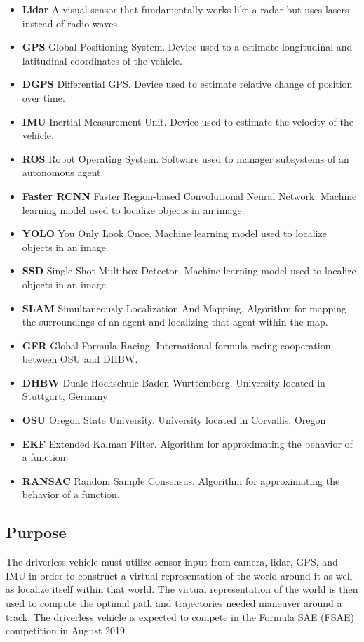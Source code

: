 \documentclass[10pt, onecolumn, draftclsnofoot, letterpaper,compsoc]{IEEEtran}
\begin{document}
\begin{itemize}
    \item \textbf{Lidar} A visual sensor that fundamentally works like a radar but uses lasers instead of radio waves
    \item \textbf{GPS} Global Positioning System. Device used to a estimate longitudinal and latitudinal coordinates of the vehicle.
    \item \textbf{DGPS} Differential GPS. Device used to estimate relative change of position over time.
    \item \textbf{IMU} Inertial Measurement Unit. Device used to estimate the velocity of the vehicle.
    \item \textbf{ROS} Robot Operating System. Software used to manager subsystems of an autonomous agent.
    \item \textbf{Faster RCNN} Faster Region-based Convolutional Neural Network. Machine learning model used to localize objects in an image.
    \item \textbf{YOLO} You Only Look Once. Machine learning model used to localize objects in an image.
    \item \textbf{SSD} Single Shot Multibox Detector. Machine learning model used to localize objects in an image.
    \item \textbf{SLAM} Simultaneously Localization And Mapping. Algorithm for mapping the surroundings of an agent and localizing that agent within the map.
    \item \textbf{GFR} Global Formula Racing. International formula racing cooperation between OSU and DHBW.
    \item \textbf{DHBW} Duale Hochschule Baden-Wurttemberg. University located in Stuttgart, Germany
    \item \textbf{OSU} Oregon State University. University located in Corvallis, Oregon
    \item \textbf{EKF} Extended Kalman Filter. Algorithm for approximating the behavior of a function.
    \item \textbf{RANSAC} Random Sample Consensus. Algorithm for approximating the behavior of a function.
\end{itemize}



\subsection{Purpose}
 The driverless vehicle must utilize sensor input from camera, lidar, GPS, and IMU in order to construct a virtual representation of the world around it as well as localize itself within that world. The virtual representation of the world is then used to compute the optimal path and trajectories needed maneuver around a track. The driverless vehicle is expected to compete in the Formula SAE (FSAE) competition in August 2019. 
\end{document}
